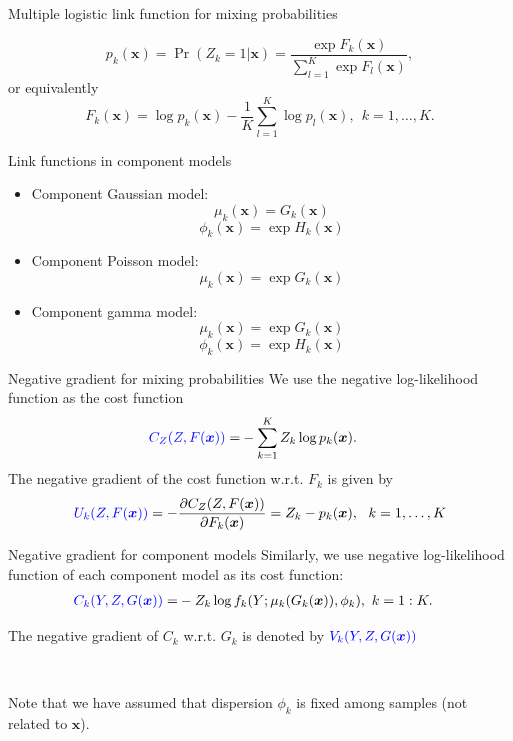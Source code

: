 \documentclass[professionalfont]{beamer}
\def\bx{\boldsymbol{x}}
\newcommand{\blue}[1]{\textcolor{blue}{#1}}
\begin{document}
\begin{frame}{Multiple logistic link function for mixing probabilities}


	 \begin{equation}\label{logistic}
	 	p_k(\bx)=\Pr(Z_k=1|\bx)=\frac{\exp{F_k(\bx)}}{\sum_{l=1}^{K}\exp{F_l(\bx)}},
	 \end{equation}
	 or equivalently
	 \begin{equation}\label{inv-logistic}
	 	F_k(\bx)=\log p_k(\bx)-\frac{1}{K}\sum_{l=1}^K\log p_l(\bx),~~k=1,\ldots,K.
	 \end{equation}
\end{frame}

\begin{frame}{Link functions in component models}

 	\begin{itemize}
 \item Component Gaussian model:
  $$\mu_k(\bx)=G_k(\bx)$$
  $$\phi_k(\bx)=\exp H_k(\bx)$$
	 \item Component Poisson model:
	 $$\mu_k(\bx)=\exp G_k(\bx)$$
	 \item Component gamma model:
	 $$\mu_k(\bx)=\exp G_k(\bx)$$
	   $$\phi_k(\bx)=\exp H_k(\bx)$$
	\end{itemize}
\end{frame}

\begin{frame}{Negative gradient for mixing probabilities}
	We use the negative log-likelihood function as the cost function
	\begin{equation}
		\begin{aligned}
			\blue{C_{Z}(Z, F(\bx))}=& - \sum_{k=1}^K Z_k \log p_k(\bx).
		\end{aligned}
	\end{equation}
	The negative gradient of the cost function w.r.t. $F_k$ is given by
	\begin{equation}
		\blue{U_k(Z,F(\bx))}=-\frac{\partial C_{Z}(Z,F(\bx))}{\partial F_k(\bx)}=
		Z_k-p_k(\bx), ~~k=1,\ldots,K
	\end{equation}
\end{frame}

\begin{frame}{Negative gradient for component models}
	Similarly, we use negative log-likelihood function of each component model as its cost function:
	\begin{equation}
		\begin{aligned}
			\blue{C_k(Y,Z,G(\bx))}=& -Z_k\log f_k(Y;\mu_k(G_k(\bx)),\phi_k), ~ k=1:K.
		\end{aligned}
	\end{equation}

The negative gradient of $C_k$ w.r.t. $G_k$ is denoted by $\blue{V_k(Y,Z,G(\bx))}$

~

Note that we have assumed that dispersion $\phi_k$ is fixed among samples (not related to $\bx$).
\end{frame}
\end{document}
